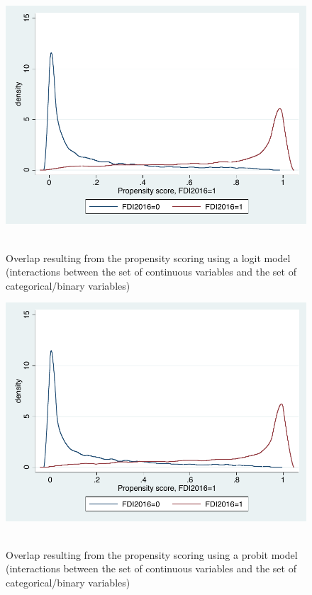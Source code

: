 \begin{figure}
	\centering
	\includegraphics[scale=0.6]{figures_and_tables/3_overlap_intlogit1o1.pdf}\
	\caption{Overlap resulting from the propensity scoring using a logit model (interactions between the set of continuous variables and the set of categorical/binary variables)}
	\label{ol_intlog1}
\end{figure}

\begin{figure}
	\centering
	\includegraphics[scale=0.6]{figures_and_tables/3_overlap_intprobit1o1.pdf}\
	\caption{Overlap resulting from the propensity scoring using a probit model (interactions between the set of continuous variables and the set of categorical/binary variables)}
	\label{ol_intprob1}
\end{figure}

